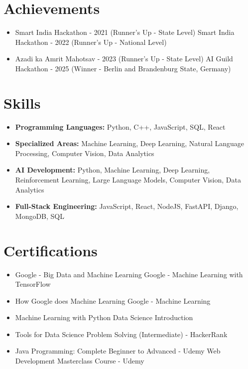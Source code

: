 \documentclass[a4paper,10pt]{article}
\begin{document}
\section*{Achievements}
\begin{itemize}
\item Smart India Hackathon - 2021 (Runner's Up - State Level) \hfill Smart India Hackathon - 2022 (Runner's Up - National Level)
\item Azadi ka Amrit Mahotsav - 2023 (Runner's Up - State Level) \hfill AI Guild Hackathon - 2025 (Winner - Berlin and Brandenburg State, Germany)
\end{itemize}

\section*{Skills}
\begin{itemize}
  \item \textbf{Programming Languages:} Python, C++, JavaScript, SQL, React
  \item \textbf{Specialized Areas:} Machine Learning, Deep Learning, Natural Language Processing, Computer Vision, Data Analytics
  \item \textbf{AI Development:} Python, Machine Learning, Deep Learning, Reinforcement Learning, Large Language Models, Computer Vision, Data Analytics
  \item \textbf{Full-Stack Engineering:} JavaScript, React, NodeJS, FastAPI, Django, MongoDB, SQL
\end{itemize}

\section*{Certifications}
\begin{itemize}
\item Google - Big Data and Machine Learning \hfill Google - Machine Learning with TensorFlow
\item How Google does Machine Learning \hfill Google - Machine Learning
\item Machine Learning with Python \hfill Data Science Introduction
\item Tools for Data Science \hfill Problem Solving (Intermediate) - HackerRank
\item Java Programming: Complete Beginner to Advanced - Udemy \hfill Web Development Masterclass Course - Udemy
\end{itemize}
\end{document}
